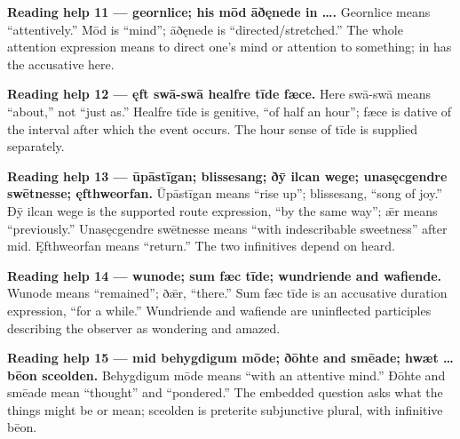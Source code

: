 \textbf{Reading help 11 — geornlice; his mōd āðęnede in ….} Geornlice means “attentively.” Mōd is “mind”; āðęnede is “directed/\allowbreak{}stretched.” The whole attention expression means to direct one’s mind or attention to something; in has the accusative here.

\textbf{Reading help 12 — ęft swā-swā healfre tīde fæce.} Here swā-swā means “about,” not “just as.” Healfre tīde is genitive, “of half an hour”; fæce is dative of the interval after which the event occurs. The hour sense of tīde is supplied separately.

\textbf{Reading help 13 — ūpāstīgan; blissesang; ðȳ ilcan wege; unasęcgendre swētnesse; ęfthweorfan.} Ūpāstīgan means “rise up”; blissesang, “song of joy.” Ðȳ ilcan wege is the supported route expression, “by the same way”; ǣr means “previously.” Unasęcgendre swētnesse means “with indescribable sweetness” after mid. Ęfthweorfan means “return.” The two infinitives depend on heard.

\textbf{Reading help 14 — wunode; sum fæc tīde; wundriende and wafiende.} Wunode means “remained”; ðǣr, “there.” Sum fæc tīde is an accusative duration expression, “for a while.” Wundriende and wafiende are uninflected participles describing the observer as wondering and amazed.

\textbf{Reading help 15 — mid behygdigum mōde; ðōhte and smēade; hwæt … bēon sceolden.} Behygdigum mōde means “with an attentive mind.” Ðōhte and smēade mean “thought” and “pondered.” The embedded question asks what the things might be or mean; sceolden is preterite subjunctive plural, with infinitive bēon.

